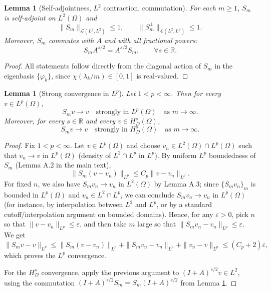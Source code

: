 \documentclass[11pt,letterpaper]{amsart}
\newtheorem{lemma}[theorem]{Lemma}
\begin{document}
\begin{lemma}[Self-adjointness, $L^2$ contraction, commutation]\label{lem:Sm-L2-app}
For each $m\ge1$, $S_m$ is self-adjoint on $L^2(\Omega)$ and
\[
\|S_m\|_{\mathcal L(L^2,L^2)}\le 1,\qquad
\|S_m^\perp\|_{\mathcal L(L^2,L^2)}\le 1.
\]
Moreover, $S_m$ commutes with $A$ and with all fractional powers:
\[
S_m A^{s/2} = A^{s/2}S_m,\qquad \forall s\in\mathbb R.
\]
\end{lemma}

\begin{proof}
All statements follow directly from the diagonal action of $S_m$ in the eigenbasis
$\{\varphi_k\}$, since $\chi(\lambda_k/m)\in[0,1]$ is real-valued.
\end{proof}


\begin{lemma}[Strong convergence in $L^p$]\label{lem:Sm-strong-Lp}
Let $1<p<\infty$. Then for every $v\in L^p(\Omega)$,
\[
S_m v \to v \quad\text{strongly in }L^p(\Omega)\quad\text{as }m\to\infty.
\]
Moreover, for every $s\in\mathbb R$ and every $v\in H^s_D(\Omega)$,
\[
S_m v \to v \quad\text{strongly in }H^s_D(\Omega)\quad\text{as }m\to\infty.
\]
\end{lemma}

\begin{proof}
Fix $1<p<\infty$. Let $v\in L^p(\Omega)$ and choose $v_n\in L^2(\Omega)\cap L^p(\Omega)$
such that $v_n\to v$ in $L^p(\Omega)$ (density of $L^2\cap L^p$ in $L^p$).
By uniform $L^p$ boundedness of $S_m$ (Lemma A.2 in the main text),
\[
\|S_m(v-v_n)\|_{L^p}\le C_p\|v-v_n\|_{L^p}.
\]
For fixed $n$, we also have $S_m v_n\to v_n$ in $L^2(\Omega)$ by Lemma A.3; since
$\{S_m v_n\}_m$ is bounded in $L^p(\Omega)$ and $v_n\in L^2\cap L^p$, we can conclude
$S_m v_n\to v_n$ in $L^p(\Omega)$ (for instance, by interpolation between $L^2$ and $L^p$,
or by a standard cutoff/interpolation argument on bounded domains).
Hence, for any $\varepsilon>0$, pick $n$ so that $\|v-v_n\|_{L^p}\le \varepsilon$, and then
take $m$ large so that $\|S_m v_n-v_n\|_{L^p}\le \varepsilon$. We get
\[
\|S_m v-v\|_{L^p}\le \|S_m(v-v_n)\|_{L^p}+\|S_m v_n-v_n\|_{L^p}+\|v_n-v\|_{L^p}
\le (C_p+2)\varepsilon,
\]
which proves the $L^p$ convergence.

For the $H^s_D$ convergence, apply the previous argument to $(I+A)^{s/2}v\in L^2$,
using the commutation $(I+A)^{s/2}S_m=S_m(I+A)^{s/2}$ from Lemma
\ref{lem:Sm-L2-app}.
\end{proof}
\end{document}
